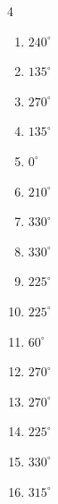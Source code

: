 \begin{multicols}{4}
\begin{enumerate}
  \item $\displaystyle 240^{\circ}$

  \item $\displaystyle 135^{\circ}$

  \item $\displaystyle 270^{\circ}$

  \item $\displaystyle 135^{\circ}$

  \item $\displaystyle 0^{\circ}$
        \phantom{$\displaystyle =0$}

  \item $\displaystyle 210^{\circ}$

  \item $\displaystyle 330^{\circ}$

  \item $\displaystyle 330^{\circ}$

  \item $\displaystyle 225^{\circ}$

  \item $\displaystyle 225^{\circ}$

  \item $\displaystyle 60^{\circ}$

  \item $\displaystyle 270^{\circ}$

  \item $\displaystyle 270^{\circ}$

  \item $\displaystyle 225^{\circ}$

  \item $\displaystyle 330^{\circ}$

  \item $\displaystyle 315^{\circ}$


\end{enumerate}
\end{multicols}
